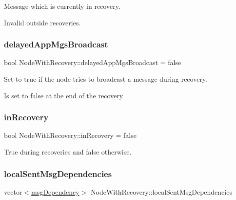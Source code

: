Message which is currently in recovery. 

Invalid outside recoveries. \mbox{\label{class_node_with_recovery_aae44e6b605047932d21cd5be25671963}} 
\subsubsection{\texorpdfstring{delayed\+App\+Mgs\+Broadcast}{delayedAppMgsBroadcast}}
{\footnotesize\ttfamily bool Node\+With\+Recovery\+::delayed\+App\+Mgs\+Broadcast = false\hspace{0.3cm}{\ttfamily [protected]}}



Set to true if the node tries to broadcast a message during recovery. 

Is set to false at the end of the recovery \mbox{\label{class_node_with_recovery_a4e8a29d0f69da296e9971bb5d8882cfb}} 
\subsubsection{\texorpdfstring{in\+Recovery}{inRecovery}}
{\footnotesize\ttfamily bool Node\+With\+Recovery\+::in\+Recovery = false\hspace{0.3cm}{\ttfamily [protected]}}



True during recoveries and false otherwise. 

\mbox{\label{class_node_with_recovery_a6b143ca2c401bbb2689443091d4d7e17}} 
\subsubsection{\texorpdfstring{local\+Sent\+Msg\+Dependencies}{localSentMsgDependencies}}
{\footnotesize\ttfamily vector$<$\hyperlink{_node_with_recovery_8h_a7a7c744666781dbc85c00bb4ccb4a60f}{msg\+Dependency}$>$ Node\+With\+Recovery\+::local\+Sent\+Msg\+Dependencies\hspace{0.3cm}{\ttfamily [protected]}}



